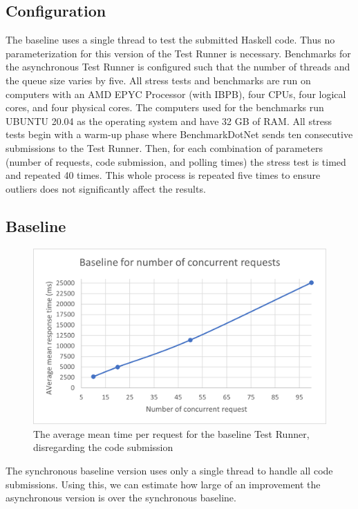 \subsection{Configuration}
The baseline uses a single thread to test the submitted Haskell code.
Thus no parameterization for this version of the Test Runner is necessary.
Benchmarks for the asynchronous Test Runner is configured such that the number of threads and the queue size varies by five.
All stress tests and benchmarks are run on computers with an AMD EPYC Processor (with IBPB), four CPUs, four logical cores, and four physical cores.
The computers used for the benchmarks run UBUNTU 20.04 as the operating system and have 32 GB of RAM.
All stress tests begin with a warm-up phase where BenchmarkDotNet sends ten consecutive submissions to the Test Runner.
Then, for each combination of parameters (number of requests, code submission, and polling times) the stress test is timed and repeated 40 times.
This whole process is repeated five times to ensure outliers does not significantly affect the results.

\subsection{Baseline}
\begin{figure}
  \centering
  \includegraphics[scale=0.80]{images/baseline.png}
  \caption{The average mean time per request for the baseline Test Runner, disregarding the code submission}
  \label{fig:baseline}
\end{figure}
The synchronous baseline version uses only a single thread to handle all code submissions.
Using this, we can estimate how large of an improvement the asynchronous version is over the synchronous baseline.

